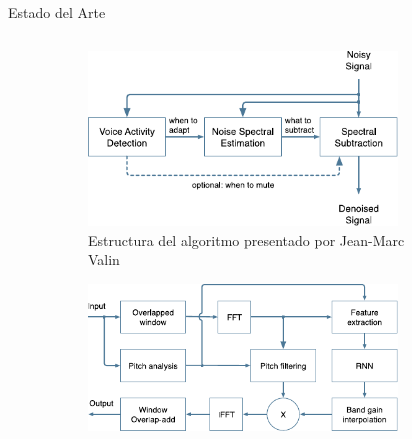 \begin{frame}[t]{Estado del Arte}
	\begin{table} [h!]
		\centering
	\end{table}
	\begin{columns}
		\begin{column}{0.6\textwidth}
			\centering
			\vspace*{-10pt}
			\begin{figure}[ht!]
				\centering
				\begin{subfigure}[t]{0.45\textwidth}
					\centering
					\includegraphics[width=0.9\textwidth]{../figures/rnn_structure.pdf}
					\caption{Estructura del algoritmo presentado por Jean-Marc Valin}
					\label{fig: rnn_structure}
				\end{subfigure}%
				\hspace*{10pt}
				\begin{subfigure}[t]{0.45\textwidth}
					\centering
					\includegraphics[width=0.9\textwidth]{../figures/rnn_block_diagram.pdf}

\end{subfigure}
\end{figure}
\end{column}
\end{columns}
\end{frame}
